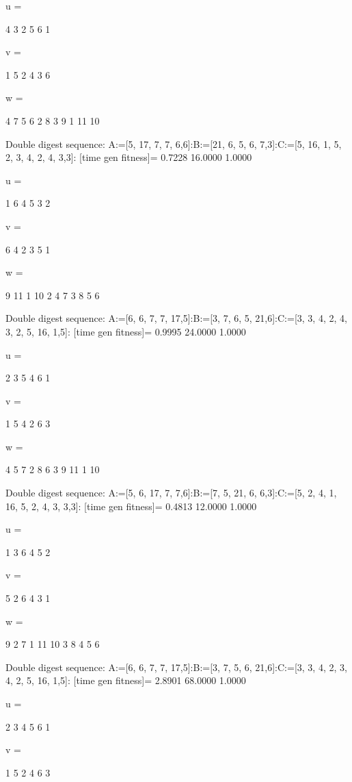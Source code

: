 u =

     4     3     2     5     6     1


v =

     1     5     2     4     3     6


w =

     4     7     5     6     2     8     3     9     1    11    10

Double digest sequence:
A:=[5, 17, 7, 7, 6,6]:B:=[21, 6, 5, 6, 7,3]:C:=[5, 16, 1, 5, 2, 3, 4, 2, 4, 3,3]:
[time gen fitness]=
    0.7228   16.0000    1.0000


u =

     1     6     4     5     3     2


v =

     6     4     2     3     5     1


w =

     9    11     1    10     2     4     7     3     8     5     6

Double digest sequence:
A:=[6, 6, 7, 7, 17,5]:B:=[3, 7, 6, 5, 21,6]:C:=[3, 3, 4, 2, 4, 3, 2, 5, 16, 1,5]:
[time gen fitness]=
    0.9995   24.0000    1.0000


u =

     2     3     5     4     6     1


v =

     1     5     4     2     6     3


w =

     4     5     7     2     8     6     3     9    11     1    10

Double digest sequence:
A:=[5, 6, 17, 7, 7,6]:B:=[7, 5, 21, 6, 6,3]:C:=[5, 2, 4, 1, 16, 5, 2, 4, 3, 3,3]:
[time gen fitness]=
    0.4813   12.0000    1.0000


u =

     1     3     6     4     5     2


v =

     5     2     6     4     3     1


w =

     9     2     7     1    11    10     3     8     4     5     6

Double digest sequence:
A:=[6, 6, 7, 7, 17,5]:B:=[3, 7, 5, 6, 21,6]:C:=[3, 3, 4, 2, 3, 4, 2, 5, 16, 1,5]:
[time gen fitness]=
    2.8901   68.0000    1.0000


u =

     2     3     4     5     6     1


v =

     1     5     2     4     6     3


